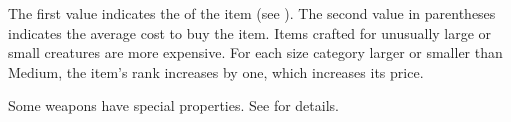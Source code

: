      The first value indicates the  of the item (see ).
    The second value in parentheses indicates the average cost to buy the item.
    Items crafted for unusually large or small creatures are more expensive.
    For each size category larger or smaller than Medium, the item's rank increases by one, which increases its price.

     Some weapons have special properties. See  for details.

